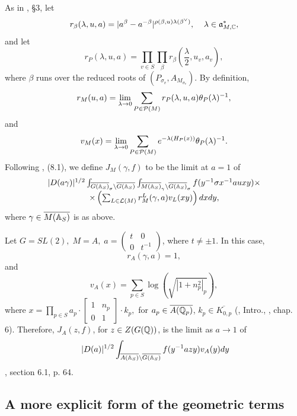 As in \cite{A7}, \S 3, let 
\[
r_\beta (\lambda ,u,a)
=|a^\beta -a^{-\beta }|^{\rho (\beta ,u)\lambda (\beta^{\vee })},
\;\;\;\;\lambda \in {\frak {a}}_{M,{\Bbb {C}}}^{*}, 
\]
and let 
\[
r_P(\lambda ,u,a)
=\prod_{v\in S}\prod_\beta
r_\beta (\frac \lambda 2,u_v,a_v), 
\]
where $\beta $ runs over the reduced roots of
$(P_{\sigma _v},A_{M_{\sigma_v}})$. By definition, 
\[
r_M(u ,a)=\lim_{\lambda \rightarrow 0}
\sum_{P\in {\cal P}(M)}r_P(\lambda ,u,a)\theta _P(\lambda )^{-1}, 
\]
and 
\[
v_M(x)=\lim_{\lambda \rightarrow 0}
\sum_{P\in {\cal P}(M)}e^{-\lambda (H_P(x))}
\theta _P(\lambda )^{-1}. 
\]
Following \cite{A7}, (8.1),
we define $J_M(\gamma ,f)$ to be the limit at $a=1$
of 
\begin{equation}
\begin{array}{c}
|D(a\gamma )|^{1/2}
\int_{\overline{G({\Bbb {A}}_S)}_\sigma \backslash
\overline{G({\Bbb {A}}_S)}}
\int_{\overline{M({\Bbb {A}}_S)}_\gamma
\backslash \overline{G({\Bbb {A}}_S)}_\sigma }
f(y^{-1}\sigma x^{-1}a u xy)\times \\
\times
\left( \sum_{L\in {\cal{L}}(M)}
r_M^L(\gamma ,a)v_L(xy)\right) dxdy,
\end{array}
\end{equation}
where $\gamma\in \overline{M({\Bbb A}_S)}$ is as above.
\begin{example}
Let $G=SL(2),\;M=A,\;a=\left( 
\begin{array}{cc}
t & 0 \\ 
0 & t^{-1}
\end{array}
\right) $, where $t\neq \pm 1$. In this case, 
\[
r_A(\gamma ,a)=1,
\]
and 
\[
v_A(x)=\sum_{p\in S}\log (\sqrt{|1+n_p^2|_p}),
\]
where $x=\prod_{p\in S}a_p\cdot \left[ 
\begin{array}{cc}
1 & n_p \\ 
0 & 1
\end{array}
\right] \cdot k_p,$ for
$a_p\in \overline{A({\Bbb {Q}}_p)}$, $k_p\in \overline{K_{0,p}}$
(\cite{A6}, Intro., \cite{Sho}, chap. 6). Therefore,
$J_A(z,f)$, for $z\in Z(G({\Bbb Q}))$,
is the limit as $a\rightarrow 1$ of 
\begin{equation}
\ |D(a)|^{1/2}
\int_{\overline{A({\Bbb {A}}_S)}\backslash \overline{G({\Bbb {A}}_S)}}
f(y^{-1} az y)v_A(y)dy 
\end{equation}
\cite{Sho}, section 6.1, p. 64.
\end{example}

\subsection{A more explicit form of the geometric terms}

